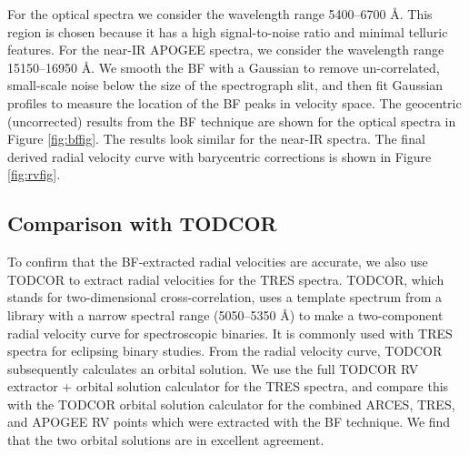 For the optical spectra we consider the wavelength range 5400--6700 \AA. This region is chosen because it has a high signal-to-noise ratio and minimal telluric features. For the near-IR APOGEE spectra, we consider the wavelength range 15150--16950 \AA. We smooth the BF with a Gaussian to remove un-correlated, small-scale noise below the size of the spectrograph slit, and then fit Gaussian profiles to measure the location of the BF peaks in velocity space. The geocentric (uncorrected) results from the BF technique are shown for the optical spectra in Figure \ref{fig:bffig}. The results look similar for the near-IR spectra. The final derived radial velocity curve with barycentric corrections is shown in Figure \ref{fig:rvfig}.

\subsection{Comparison with TODCOR}\label{todcor}
To confirm that the BF-extracted radial velocities are accurate, we also use TODCOR \citep{zuc94} to extract radial velocities for the TRES spectra. TODCOR, which stands for two-dimensional cross-correlation, uses a template spectrum from a library with a narrow spectral range (5050--5350 \AA) to make a two-component radial velocity curve for spectroscopic binaries. It is commonly used with TRES spectra for eclipsing binary studies. From the radial velocity curve, TODCOR subsequently calculates an orbital solution. We use the full TODCOR RV extractor + orbital solution calculator for the TRES spectra, and compare this with the TODCOR orbital solution calculator for the combined ARCES, TRES, and APOGEE RV points which were extracted with the BF technique. We find that the two orbital solutions are in excellent agreement.

    
  